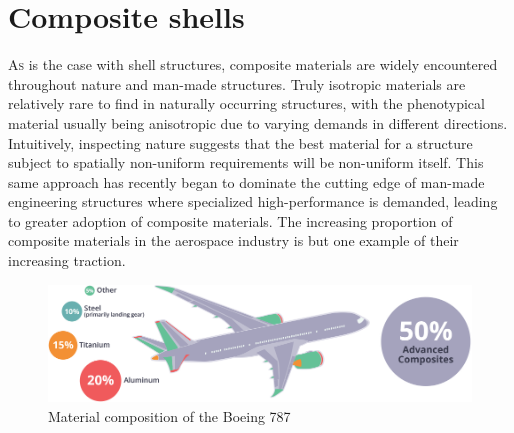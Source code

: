 



\chapter{Composite shells}
\label{chap:chapter_2_1}

\renewcommand{\Thema}{Composite shells}

\lettrine[lines=2]{A}{s} is the case with shell structures, composite materials are widely encountered throughout nature and man-made structures. Truly isotropic materials are relatively rare to find in naturally occurring structures, with the phenotypical material usually being anisotropic due to varying demands in different directions. Intuitively, inspecting nature suggests that the best material for a structure subject to spatially non-uniform requirements will be non-uniform itself. This same approach has recently began to dominate the cutting edge of man-made engineering structures where specialized high-performance is demanded, leading to greater adoption of composite materials. The increasing proportion of composite materials in the aerospace industry is but one example of their increasing traction.

\begin{figure}[H]
	\centering
	\def\svgwidth{\columnwidth}
	\includegraphics[width=14cm]{images/composites_aerospace.png}
	\caption{Material composition of the Boeing 787 \cite{AMCA2017}}
	\label{composite_aerospace}
\end{figure}

